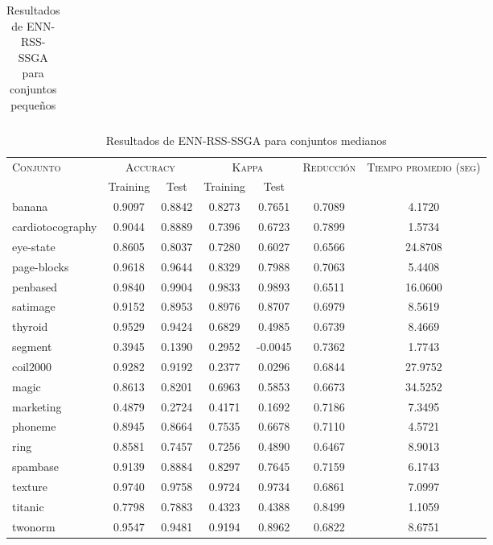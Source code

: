 \begin{table}[]
\begin{tabular}{l c c c c c c}
\hline
\end{tabular}
\caption{Resultados de ENN-RSS-SSGA para conjuntos pequeños }
\label{res-peq-ENN-RSS-ssga}
\end{table}


\begin{table}[]
\centering
\begin{tabular}{l c c c c c c}
\hline
\multirow{2}{*}{\textsc{Conjunto}}
	& \multicolumn{2}{c}{\textsc{Accuracy}}
	& \multicolumn{2}{c}{\textsc{Kappa}}
	& \textsc{Reducción}
	& \textsc{Tiempo promedio (seg)} \\
	& Training & Test
	& Training & Test \\ 
\hline
\hline

banana & 0.9097 & 0.8842 & 0.8273 & 0.7651 & 0.7089 & 4.1720 \\
cardiotocography & 0.9044 & 0.8889 & 0.7396 & 0.6723 & 0.7899 & 1.5734 \\
eye-state & 0.8605 & 0.8037 & 0.7280 & 0.6027 & 0.6566 &  24.8708 \\
page-blocks & 0.9618 & 0.9644 & 0.8329 & 0.7988 & 0.7063 & 5.4408 \\
penbased & 0.9840 & 0.9904 & 0.9833 & 0.9893 & 0.6511 & 16.0600 \\
satimage & 0.9152 & 0.8953 & 0.8976 & 0.8707 & 0.6979 & 8.5619 \\
thyroid & 0.9529 & 0.9424 & 0.6829 & 0.4985 & 0.6739 & 8.4669 \\
segment & 0.3945 & 0.1390 & 0.2952 & -0.0045 & 0.7362 & 1.7743 \\
coil2000 & 0.9282 & 0.9192 & 0.2377 & 0.0296 & 0.6844 &  27.9752 \\
magic & 0.8613 & 0.8201 & 0.6963 & 0.5853 & 0.6673 &  34.5252 \\
marketing & 0.4879 & 0.2724 & 0.4171 & 0.1692 & 0.7186 & 7.3495 \\
phoneme & 0.8945 & 0.8664 & 0.7535 & 0.6678 & 0.7110 & 4.5721 \\
ring & 0.8581 & 0.7457 & 0.7256 & 0.4890 & 0.6467 & 8.9013 \\
spambase & 0.9139 & 0.8884 & 0.8297 & 0.7645 & 0.7159 & 6.1743 \\
texture & 0.9740 & 0.9758 & 0.9724 & 0.9734 & 0.6861 & 7.0997 \\
titanic & 0.7798 & 0.7883 & 0.4323 & 0.4388 & 0.8499 & 1.1059 \\
twonorm & 0.9547 & 0.9481 & 0.9194 & 0.8962 & 0.6822 & 8.6751 \\

\hline
\end{tabular}
\caption{Resultados de ENN-RSS-SSGA para conjuntos medianos }
\label{res-med-ENN-RSS-ssga}
\end{table}



